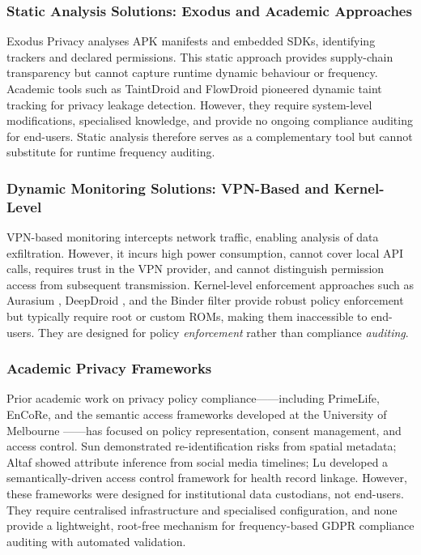 \subsubsection{Static Analysis Solutions: Exodus and Academic Approaches}

Exodus Privacy analyses APK manifests and embedded SDKs, identifying trackers and declared permissions. This static approach provides supply-chain transparency but cannot capture runtime dynamic behaviour or frequency. Academic tools such as TaintDroid \cite{49} and FlowDroid pioneered dynamic taint tracking for privacy leakage detection. However, they require system-level modifications, specialised knowledge, and provide no ongoing compliance auditing for end-users. Static analysis therefore serves as a complementary tool but cannot substitute for runtime frequency auditing.

\subsubsection{Dynamic Monitoring Solutions: VPN-Based and Kernel-Level}

VPN-based monitoring intercepts network traffic, enabling analysis of data exfiltration. However, it incurs high power consumption, cannot cover local API calls, requires trust in the VPN provider, and cannot distinguish permission access from subsequent transmission. Kernel-level enforcement approaches such as Aurasium \cite{42}, DeepDroid \cite{44}, and the Binder filter \cite{45} provide robust policy enforcement but typically require root or custom ROMs, making them inaccessible to end-users. They are designed for policy \emph{enforcement} rather than compliance \emph{auditing}.

\subsubsection{Academic Privacy Frameworks}

Prior academic work on privacy policy compliance——including PrimeLife, EnCoRe, and the semantic access frameworks developed at the University of Melbourne \cite{15,16,17}——has focused on policy representation, consent management, and access control. Sun \cite{15} demonstrated re-identification risks from spatial metadata; Altaf \cite{16} showed attribute inference from social media timelines; Lu \cite{17} developed a semantically-driven access control framework for health record linkage. However, these frameworks were designed for institutional data custodians, not end-users. They require centralised infrastructure and specialised configuration, and none provide a lightweight, root-free mechanism for frequency-based GDPR compliance auditing with automated validation.

